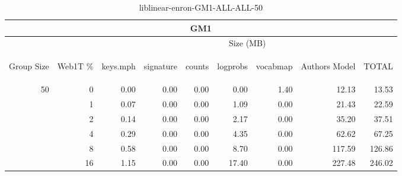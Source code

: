 \begin{center}
\begin{table}[htbp] 
 \begin{center}
\begin{tabular}{ | r | r | r | r | r | r | r | r | r |}
\hline
\multicolumn{9}{|c|}{GM1}\\
\hline
 & & \multicolumn{7}{|c|}{Size (MB)}\\ \cline{3-9}
\begin{sideways}Group Size\end{sideways} & \begin{sideways}Web1T \% \end{sideways} & \begin{sideways}keys.mph\end{sideways} & \begin{sideways}signature\end{sideways} & \begin{sideways}counts\end{sideways} & \begin{sideways}logprobs\end{sideways} & \begin{sideways}vocabmap\end{sideways} & \begin{sideways}Authors Model \end{sideways} & \begin{sideways}TOTAL\end{sideways}\\
\hline
\multirow{5}{*}{50}
 & 0 & 0.00 & 0.00 & 0.00 & 0.00 & 1.40 & 12.13 & 13.53\\ \cline{2-9}
 & 1 & 0.07 & 0.00 & 0.00 & 1.09 & 0.00 & 21.43 & 22.59\\ \cline{2-9}
 & 2 & 0.14 & 0.00 & 0.00 & 2.17 & 0.00 & 35.20 & 37.51\\ \cline{2-9}
 & 4 & 0.29 & 0.00 & 0.00 & 4.35 & 0.00 & 62.62 & 67.25\\ \cline{2-9}
 & 8 & 0.58 & 0.00 & 0.00 & 8.70 & 0.00 & 117.59 & 126.86\\ \cline{2-9}
 & 16 & 1.15 & 0.00 & 0.00 & 17.40 & 0.00 & 227.48 & 246.02\\ \cline{2-9}
\hline
\end{tabular}
\caption{liblinear-enron-GM1-ALL-ALL-50}
\label{table:liblinear-enron-GM1-ALL-ALL-50}
\end{center}
 \end{table}
\end{center}

